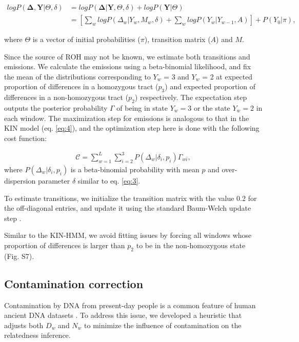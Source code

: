 \documentclass[12pt, letterpaper]{article}
\begin{document}
\begin{align}\label{eq:10}
    log P(\mathbf{\Delta},\mathbf{Y}|\Theta,\delta) &= log P(\mathbf{\Delta}|\mathbf{Y},\Theta, \delta) + log P(\mathbf{Y}|\Theta)\nonumber\\
 &= [\sum_{w} log P(\Delta_w|Y_w, M_w, \delta) + \sum_{w} log P(Y_w|Y_{w-1}, A)] + P(Y_0| \pi),
\end{align}

where $\Theta$ is a vector of initial probabilities ($\pi$), transition matrix ($A$) and $M$.

Since the source of ROH may not be known, we estimate both transitions and emissions. We calculate the emissions using a beta-binomial likelihood, and fix the mean of the distributions corresponding to $Y_w$ = 3 and $Y_w$ = 2 at expected proportion of differences in a homozygous tract ($p_3$) and expected proportion of differences in a non-homozygous tract ($p_2$) respectively. The expectation step outputs the posterior probability $\Gamma$ of being in state $Y_w=3$ or the state $Y_w=2$ in each window. The maximization step for emissions is analogous to that in the KIN model (eq. \ref{eq:4}), and the optimization step here is done with the following cost function:

\begin{align}\label{eq:11}
\mathcal{C} = \sum_{w=1}^L \sum_{i=2}^3 P(\Delta_w|\delta_{i},p_{i}) \Gamma_{wi} ,
\end{align}
where $P(\Delta_w|\delta_{i},p_{i})$ is a beta-binomial probability with mean $p$ and over-dispersion parameter $\delta$ similar to eq. \ref{eq:3}.

To estimate transitions, we initialize the transition matrix with the value 0.2 for the off-diagonal entries, and update it using the standard Baum-Welch update step \cite{baum_maximization_1970}.

Similar to the KIN-HMM, we avoid fitting issues by forcing all windows whose proportion of differences is larger than $p_2$ to be in the non-homozygous state (Fig. S7).

\subsection{Contamination correction}\label{contam}
Contamination by DNA from present-day people is a common feature of human ancient DNA datasets \cite{peyregne_present-day_2020}. To address this issue, we developed a heuristic that adjusts both $D_w$ and $N_w$ to minimize the influence of contamination on the relatedness inference.
\end{document}
